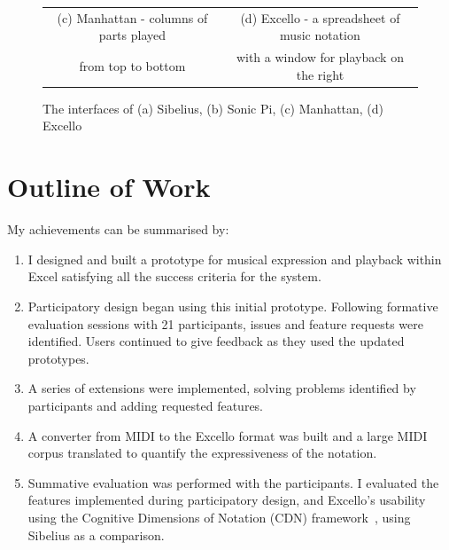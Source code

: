 \begin{figure}[ht]
\begin{tabular}{cc}
  (c) Manhattan - columns of parts played&(d) Excello - a spreadsheet of music notation\\
  from top to bottom&with a window for playback on the right\\
\end{tabular}
\caption{The interfaces of (a) Sibelius, (b) Sonic Pi, (c) Manhattan, (d) Excello}
\label{intro:interfaces}
\end{figure}

\vspace{-10pt}

\section{Outline of Work}

My achievements can be summarised by:

\begin{enumerate}

\item I designed and built a prototype for musical expression and playback within Excel satisfying all the success criteria for the system.

\item Participatory design began using this initial prototype. Following formative evaluation sessions with 21 participants, issues and feature requests were identified. Users continued to give feedback as they used the updated prototypes.

\item A series of extensions were implemented, solving problems identified by participants and adding requested features.

\item A converter from MIDI to the Excello format was built and a large MIDI corpus translated to quantify the expressiveness of the notation.

\item Summative evaluation was performed with the participants. I evaluated the features implemented during participatory design, and Excello's usability using the Cognitive Dimensions of Notation (CDN) framework~\cite{blackwell:tutorial}, using Sibelius as a comparison.

\end{enumerate}
